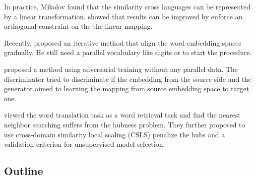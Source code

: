 In practice, Mikolov found that the similarity cross languages can be represented by a linear transformation.\cite{xing2015normalized} showed that results can be improved by enforce an orthogonal constraint on the the linear mapping.

Recently, \cite{artetxe2017learning} proposed an iterative method that align the word embedding spaces gradually. He still need a parallel vocabulary like digits or to start the procedure.

\cite{cao2016distribution}
 \cite{zhang2017adversarial} proposed a method using adversarial training without any parallel data. The discriminator tried to discriminate if the embedding from the source side and the generator aimed to learning the mapping from source embedding space to target one.



\cite{conneau2017word} viewed the word translation task as a word retrieval task and find the nearest neighbor searching suffers from the hubness problem. They further proposed to use cross-domain similarity local scaling (CSLS) penalize the hubs and a validation criterion for unsupervised model selection.


\subsection{Outline}











